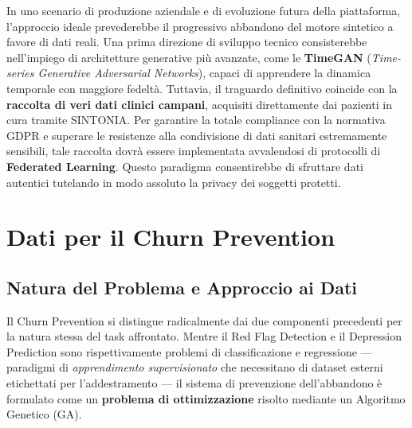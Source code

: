 In uno scenario di produzione aziendale e di evoluzione futura della piattaforma, l'approccio ideale prevederebbe il progressivo abbandono del motore sintetico a favore di dati reali. Una prima direzione di sviluppo tecnico consisterebbe nell'impiego di architetture generative più avanzate, come le \textbf{TimeGAN} (\textit{Time-series Generative Adversarial Networks}), capaci di apprendere la dinamica temporale con maggiore fedeltà. Tuttavia, il traguardo definitivo coincide con la \textbf{raccolta di veri dati clinici campani}, acquisiti direttamente dai pazienti in cura tramite SINTONIA. Per garantire la totale compliance con la normativa GDPR e superare le resistenze alla condivisione di dati sanitari estremamente sensibili, tale raccolta dovrà essere implementata avvalendosi di protocolli di \textbf{Federated Learning}. Questo paradigma consentirebbe di sfruttare dati autentici tutelando in modo assoluto la privacy dei soggetti protetti.

\clearpage
\section{Dati per il Churn Prevention}
\label{sec:data_churn}

\subsection{Natura del Problema e Approccio ai Dati}
\label{subsec:natura_churn}

Il Churn Prevention si distingue radicalmente dai due componenti precedenti per la natura stessa del task affrontato. Mentre il Red Flag Detection e il Depression Prediction sono rispettivamente problemi di classificazione e regressione --- paradigmi di \textit{apprendimento supervisionato} che necessitano di dataset esterni etichettati per l'addestramento --- il sistema di prevenzione dell'abbandono è formulato come un \textbf{problema di ottimizzazione} risolto mediante un Algoritmo Genetico (GA).

